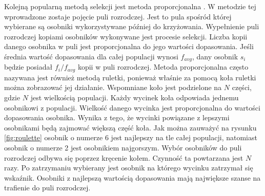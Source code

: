 \documentclass[twoside]{iisthesis}
\begin{document}
Kolejną popularną metodą selekcji jest metoda proporcjonalna \cite{book}. W metodzie tej wprowadzone zostaje pojęcie puli rozrodczej. Jest to pula spośród której wybierane są osobniki wykorzystywane później do krzyżowania. Wypełnienie puli rozrodczej kopiami osobników wykonywane jest procesie selekcji. Liczba kopii danego osobnika w puli jest proporcjonalna do jego wartości dopasowania. Jeśli średnia wartość dopasowania dla całej populacji wynosi $f_{avg}$, dany osobnik $s_{i}$ będzie posiadał $f_{i}/f_{avg}$ kopii w puli rozrodczej. Metoda proporcjonalna często nazywana jest również metodą ruletki, ponieważ właśnie za pomocą koła ruletki można zobrazować jej działanie. Wspomniane koło jest podzielone na $N$ części, gdzie $N$ jest wielkością populacji. Każdy wycinek koła odpowiada jednemu osobnikowi z populacji. Wielkość danego wycinka jest proporcjonalna do wartości dopasowania osobnika. Wynika z tego, że wycinki powiązane z lepszymi osobnikami będą zajmować większą część koła. Jak można zauważyć na rysunku \eqref{fig:roulette} osobnik o numerze 6 jest najlepszy na tle całej populacji, natomiast osobnik o numerze 2 jest osobnikiem najgorszym. Wybór osobników do puli rozrodczej odbywa się poprzez kręcenie kołem. Czynność ta powtarzana jest $N$ razy. Po zatrzymaniu wybierany jest osobnik na którego wycinku zatrzymał się wskaźnik. Osobniki z najlepszą wartością dopasowania mają największe szanse na trafienie do puli rozrodczej.
\end{document}

